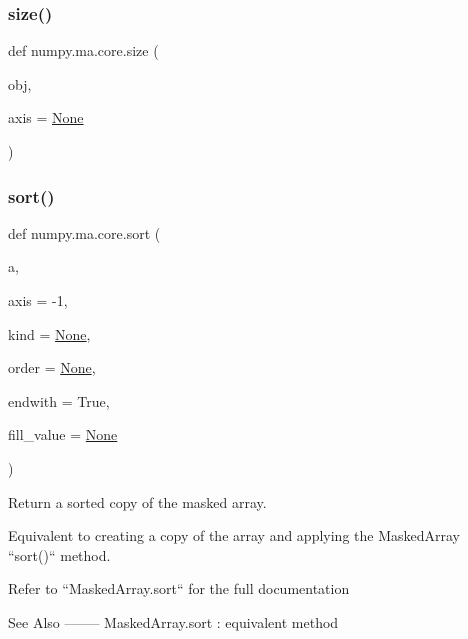 \subsubsection{\texorpdfstring{size()}{size()}}
{\footnotesize\ttfamily def numpy.\+ma.\+core.\+size (\begin{DoxyParamCaption}\item[{}]{obj,  }\item[{}]{axis = {\ttfamily \hyperlink{namespacenumpy_1_1ma_1_1core_a647ee1848dfa3692fe35a663a2aa40b3}{None}} }\end{DoxyParamCaption})}

\mbox{\label{namespacenumpy_1_1ma_1_1core_a28496f13c5d3890313d8025f4a85910d}} 
\subsubsection{\texorpdfstring{sort()}{sort()}}
{\footnotesize\ttfamily def numpy.\+ma.\+core.\+sort (\begin{DoxyParamCaption}\item[{}]{a,  }\item[{}]{axis = {\ttfamily -\/1},  }\item[{}]{kind = {\ttfamily \hyperlink{namespacenumpy_1_1ma_1_1core_a647ee1848dfa3692fe35a663a2aa40b3}{None}},  }\item[{}]{order = {\ttfamily \hyperlink{namespacenumpy_1_1ma_1_1core_a647ee1848dfa3692fe35a663a2aa40b3}{None}},  }\item[{}]{endwith = {\ttfamily True},  }\item[{}]{fill\+\_\+value = {\ttfamily \hyperlink{namespacenumpy_1_1ma_1_1core_a647ee1848dfa3692fe35a663a2aa40b3}{None}} }\end{DoxyParamCaption})}

\begin{DoxyVerb}Return a sorted copy of the masked array.

Equivalent to creating a copy of the array
and applying the  MaskedArray ``sort()`` method.

Refer to ``MaskedArray.sort`` for the full documentation

See Also
--------
MaskedArray.sort : equivalent method
\end{DoxyVerb}
 \mbox{\label{namespacenumpy_1_1ma_1_1core_a0da0f9a7940ab17eb24d4dcf33a61aa5}} 
